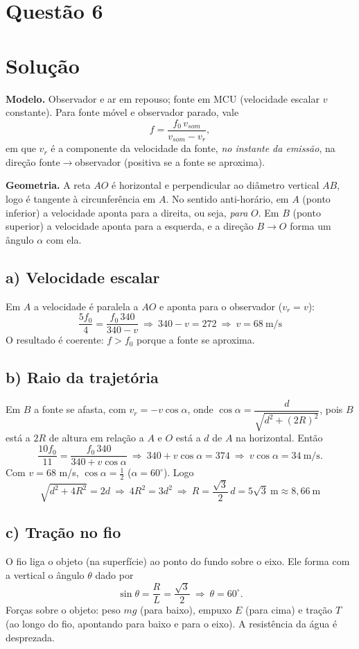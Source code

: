 \documentclass{article}%
\begin{document}
\section*{Questão 6}

\section*{Solução}

\textbf{Modelo.} Observador e ar em repouso; fonte em MCU (velocidade escalar $v$ constante). Para fonte móvel e observador parado, vale
\[
f=\dfrac{f_0\,v_{som}}{v_{som}-v_r},
\]
em que $v_r$ é a componente da velocidade da fonte, \emph{no instante da emissão}, na direção fonte$\to$observador (positiva se a fonte se aproxima).

\textbf{Geometria.} A reta $AO$ é horizontal e perpendicular ao diâmetro vertical $AB$, logo é tangente à circunferência em $A$. No sentido anti-horário, em $A$ (ponto inferior) a velocidade aponta para a direita, ou seja, \emph{para} $O$. Em $B$ (ponto superior) a velocidade aponta para a esquerda, e a direção $B\to O$ forma um ângulo $\alpha$ com ela.

\subsection*{a) Velocidade escalar}
Em $A$ a velocidade é paralela a $AO$ e aponta para o observador ($v_r=v$):
\[
\dfrac{5f_0}{4}=\dfrac{f_0\,340}{340-v}\ \Rightarrow\ 340-v=272\ \Rightarrow\ \boxed{v=68\ \text{m/s}}
\]
O resultado é coerente: $f>f_0$ porque a fonte se aproxima.

\subsection*{b) Raio da trajetória}
Em $B$ a fonte se afasta, com $v_r=-v\cos\alpha$, onde $\cos\alpha=\dfrac{d}{\sqrt{d^2+(2R)^2}}$, pois $B$ está a $2R$ de altura em relação a $A$ e $O$ está a $d$ de $A$ na horizontal. Então
\[
\dfrac{10f_0}{11}=\dfrac{f_0\,340}{340+v\cos\alpha}\ \Rightarrow\ 340+v\cos\alpha=374\ \Rightarrow\ v\cos\alpha=34\ \text{m/s}.
\]
Com $v=68$ m/s, $\cos\alpha=\tfrac12$ ($\alpha=60^\circ$). Logo
\[
\sqrt{d^2+4R^2}=2d\ \Rightarrow\ 4R^2=3d^2\ \Rightarrow\ \boxed{R=\dfrac{\sqrt3}{2}\,d=5\sqrt3\ \text{m}\approx 8{,}66\ \text{m}}
\]

\subsection*{c) Tração no fio}
O fio liga o objeto (na superfície) ao ponto do fundo sobre o eixo. Ele forma com a vertical o ângulo $\theta$ dado por
\[
\sin\theta=\dfrac{R}{L}=\dfrac{\sqrt3}{2}\ \Rightarrow\ \theta=60^\circ .
\]
Forças sobre o objeto: peso $mg$ (para baixo), empuxo $E$ (para cima) e tração $T$ (ao longo do fio, apontando para baixo e para o eixo). A resistência da água é desprezada.
\end{document}
